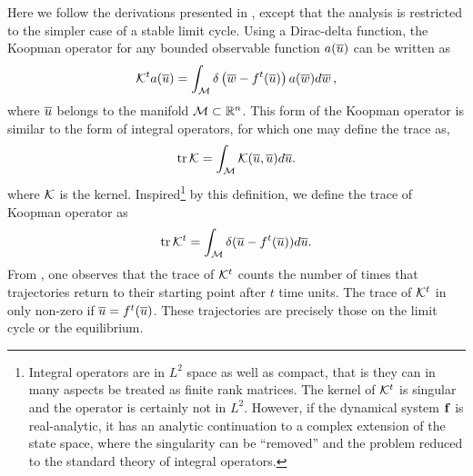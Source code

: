 Here we follow the derivations  presented in
, %
except that the analysis is restricted to the simpler case of a
stable limit cycle. Using a Dirac-delta function, the Koopman
operator for any bounded observable function $a(\overline{u})$ can be written
as
%
\begin{equation}\nonumber
{\cal K}^t a(\overline{u}) =
  \int_{{\cal M}}\delta\left(\overline{w}-{f^{t}(\overline{u})}\right)a(\overline{w})d\overline{w}
\,,
\end{equation}
%
where $\overline{u}$ belongs to the manifold ${\cal M}\subset\mathbb{R}^n$.
This form of the Koopman operator is similar to the form of integral
operators, for which one may define the trace as,
%
\[
\mbox{\rm tr}\, {\cal K} =\int_{{\cal M}}{\cal K}(\overline{u},\overline{u})d\overline{u}.
\]
%
where ${\cal K}$ is the kernel.
Inspired\footnote{
Integral operators are in $L^2$ space as well as compact, that is
they can in many aspects be treated as finite rank matrices. The
kernel of ${\cal K}^t$ is singular and the operator is certainly not in
$L^2$. However, if the dynamical system ${\bf f}$ is real-analytic, it
has an analytic continuation to a complex extension of the state
space, where the singularity can be ``removed'' and the problem
reduced to the standard theory of integral operators.}
by this definition, we define the trace of Koopman operator as
%
\begin{equation}
 \mbox{\rm tr}\, {\cal K}^t = \int_{{\cal M}}\delta(\overline{u}-{f^{t}(\overline{u})})d\overline{u}.
\label{eq:tr2}
\end{equation}
%
%
From , one observes that the trace of ${\cal K}^t$ counts
the number of times that trajectories return to their starting point
after $t$ time units.
The trace of ${\cal K}^t$ in only non-zero if $\overline{u}={f^{t}(\overline{u})}$.
These trajectories are precisely those on the limit cycle or  the
equilibrium.


